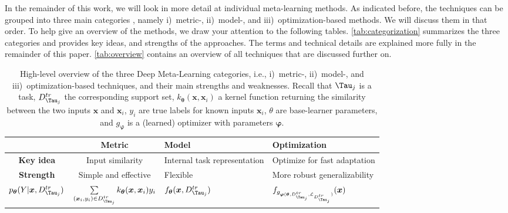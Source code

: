 In the remainder of this work, we will look in more detail at individual meta-learning methods. 
As indicated before, the techniques can be grouped into three main categories , namely
i)~metric-, ii)~model-, and iii)~opti\-mization-based methods. We will discuss them in that order. 
To help give an overview of the methods, we draw your attention to the following tables. 
\autoref{tab:categorization} summarizes the three categories and provides  key ideas, and strengths of the approaches. The terms and technical details are explained more fully in the remainder of this paper. \autoref{tab:overview} contains an  overview of all techniques that are discussed further on.  
\begin{table}[tb]
    \begin{tabularx}{\linewidth}{ccXX}
    \toprule
         & \textbf{Metric} & \textbf{Model} & \textbf{Optimization} \\
        \midrule
         \textbf{Key idea}& Input similarity & Internal task \hfill \allowbreak representation & Optimize for fast \hfill \allowbreak adaptation \hfill \\
         \textbf{Strength}& Simple and effective & Flexible & More robust generalizability \\
         \textbf{$p_{\boldsymbol{\theta}}(Y | \boldsymbol{x}, D^{tr}_{\Tau_{j}})$} & $\sum\limits_{(\boldsymbol{x}_{i}, y_{i}) \in D^{tr}_{\Tau_{j}}} k_{\boldsymbol{\theta}}(\boldsymbol{x}, \boldsymbol{x}_{i})y_{i}$ & $f_{\boldsymbol{\theta}}(\boldsymbol{x}, D^{tr}_{\Tau_{j}})$ & $f_{g_{\boldsymbol{\varphi}(\boldsymbol{\theta}, D_{\Tau_{j}}^{tr}, \mathcal{L}_{D^{tr}_{\Tau_{j}}})} }(\boldsymbol{x})$ \\
         \bottomrule
    \end{tabularx}
    \caption{High-level overview of the three Deep Meta-Learning categories, i.e., i)~metric-, ii)~model-, and iii)~optimization-based techniques, and their main strengths and weaknesses. Recall that $\Tau_{j}$ is a task, $D^{tr}_{\Tau_{j}}$ the corresponding support set, $k_{\boldsymbol{\theta}}(\boldsymbol{x}, \boldsymbol{x}_{i})$ a kernel function returning the similarity between the two inputs $\boldsymbol{x}$ and $\boldsymbol{x}_{i}$, $y_{i}$ are true labels for known inputs $\boldsymbol{x}_{i}$, $\theta$ are base-learner parameters, and $g_{\boldsymbol{\varphi}}$ is a (learned) optimizer with parameters $\boldsymbol{\varphi}$.}
    \label{tab:categorization}
\end{table}
